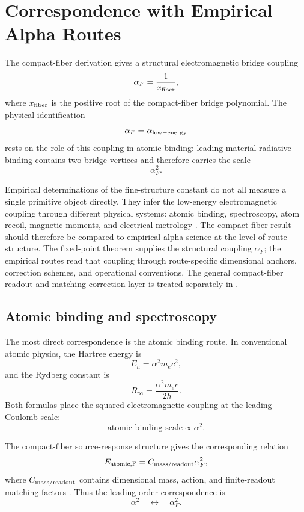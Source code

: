 \section{Correspondence with Empirical Alpha Routes}

The compact-fiber derivation gives a structural electromagnetic bridge
coupling
\[
\alpha_F=\frac1{x_{\rm fiber}},
\]
where \(x_{\rm fiber}\) is the positive root of the compact-fiber bridge
polynomial. The physical identification
\[
\alpha_F=\alpha_{\rm low-energy}
\]
rests on the role of this coupling in atomic binding: leading
material-radiative binding contains two bridge vertices and therefore
carries the scale
\[
\alpha_F^2.
\]

Empirical determinations of the fine-structure constant do not all
measure a single primitive object directly. They infer the low-energy
electromagnetic coupling through different physical systems: atomic
binding, spectroscopy, atom recoil, magnetic moments, and electrical
metrology
\cite{NIST_CODATA_2022_alpha_inv,Parker2018_alpha_Cs,
Morel2020_alpha_Rb,Aoyama2019_electron_gminus2_review,
BIPM_SI_Brochure_9th}. The compact-fiber result should therefore be
compared to empirical alpha science at the level of route structure. The
fixed-point theorem supplies the structural coupling \(\alpha_F\); the
empirical routes read that coupling through route-specific dimensional
anchors, correction schemes, and operational conventions. The general
compact-fiber readout and matching-correction layer is treated separately
in \cite{Wells2026FiniteReadout}.

\subsection{Atomic binding and spectroscopy}

The most direct correspondence is the atomic binding route. In
conventional atomic physics, the Hartree energy is
\[
E_h=\alpha^2m_ec^2,
\]
and the Rydberg constant is
\[
R_\infty=\frac{\alpha^2m_ec}{2h}.
\]
Both formulas place the squared electromagnetic coupling at the leading
Coulomb scale:
\[
\text{atomic binding scale}\propto \alpha^2.
\]

The compact-fiber source-response structure gives the corresponding
relation
\[
E_{\rm atomic,F}
=
C_{\rm mass/readout}\alpha_F^2,
\]
where \(C_{\rm mass/readout}\) contains dimensional mass, action, and
finite-readout matching factors \cite{Wells2026FiniteReadout}. Thus the
leading-order correspondence is
\[
\alpha^2
\quad
\leftrightarrow
\quad
\alpha_F^2.
\]

